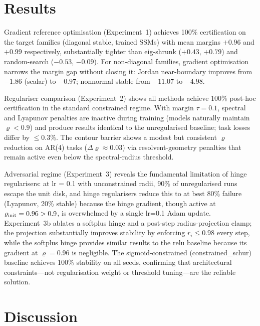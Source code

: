 \documentclass{article}
\theoremstyle{definition}
\begin{document}
\section{Results}
\label{sec:results}

Gradient reference optimisation (Experiment~1) achieves 100\%
certification on the target families (diagonal stable, trained SSMs)
with mean margins $+0.96$ and $+0.99$ respectively, substantially
tighter than eig-shrunk ($+0.43$, $+0.79$) and random-search ($-0.53$,
$-0.09$).  For non-diagonal families, gradient optimisation narrows the
margin gap without closing it: Jordan near-boundary improves from
$-1.86$ (scalar) to $-0.97$; nonnormal stable from $-11.07$ to
$-4.98$.

Regulariser comparison (Experiment~2) shows all methods achieve 100\%
post-hoc certification in the standard constrained regime.  With margin
$\tau=0.1$, spectral and Lyapunov penalties are inactive during training
(models naturally maintain $\varrho<0.9$) and produce results identical
to the unregularised baseline; task losses differ by $\leq 0.3\%$.  The
contour barrier shows a modest but consistent $\varrho$ reduction on AR(4)
tasks ($\Delta\varrho\approx0.03$) via resolvent-geometry penalties that
remain active even below the spectral-radius threshold.

Adversarial regime (Experiment~3) reveals the fundamental limitation of
hinge regularisers: at lr = 0.1 with unconstrained radii, 90\% of
unregularised runs escape the unit disk, and hinge regularisers reduce
this to at best 80\% failure (Lyapunov, 20\% stable) because the hinge
gradient, though active at $\varrho_{\rm init}=0.96>0.9$, is overwhelmed
by a single lr=0.1 Adam update.
Experiment~3b ablates a softplus hinge and a post-step radius-projection
clamp; the projection substantially improves stability by enforcing
$r_i \leq 0.98$ every step, while the softplus hinge provides similar
results to the relu baseline because its gradient at $\varrho=0.96$ is
negligible.  The sigmoid-constrained (constrained\_schur) baseline
achieves 100\% stability on all seeds, confirming that architectural
constraints---not regularisation weight or threshold tuning---are the
reliable solution.

\section{Discussion}
\label{sec:discussion}
\end{document}
